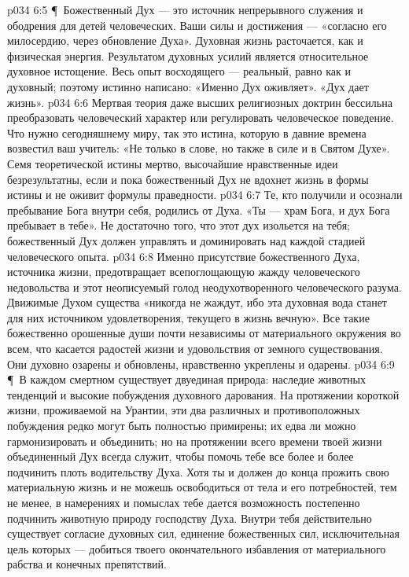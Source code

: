 \vs p034 6:5 \P\ Божественный Дух --- это источник непрерывного служения и ободрения для детей человеческих. Ваши силы и достижения --- «согласно его милосердию, через обновление Духа». Духовная жизнь расточается, как и физическая энергия. Результатом духовных усилий является относительное духовное истощение. Весь опыт восходящего --- реальный, равно как и духовный; поэтому истинно написано: «Именно Дух оживляет». «Дух дает жизнь».
\vs p034 6:6 Мертвая теория даже высших религиозных доктрин бессильна преобразовать человеческий характер или регулировать человеческое поведение. Что нужно сегодняшнему миру, так это истина, которую в давние времена возвестил ваш учитель: «Не только в слове, но также в силе и в Святом Духе». Семя теоретической истины мертво, высочайшие нравственные идеи безрезультатны, если и пока божественный Дух не вдохнет жизнь в формы истины и не оживит формулы праведности.
\vs p034 6:7 Те, кто получили и осознали пребывание Бога внутри себя, родились от Духа. «Ты --- храм Бога, и дух Бога пребывает в тебе». Не достаточно того, что этот дух изольется на тебя; божественный Дух должен управлять и доминировать над каждой стадией человеческого опыта.
\vs p034 6:8 Именно присутствие божественного Духа, источника жизни, предотвращает всепоглощающую жажду человеческого недовольства и этот неописуемый голод неодухотворенного человеческого разума. Движимые Духом существа «никогда не жаждут, ибо эта духовная вода станет для них источником удовлетворения, текущего в жизнь вечную». Все такие божественно орошенные души почти независимы от материального окружения во всем, что касается радостей жизни и удовольствия от земного существования. Они духовно озарены и обновлены, нравственно укреплены и одарены.
\vs p034 6:9 \P\ В каждом смертном существует двуединая природа: наследие животных тенденций и высокие побуждения духовного дарования. На протяжении короткой жизни, проживаемой на Урантии, эти два различных и противоположных побуждения редко могут быть полностью примирены; их едва ли можно гармонизировать и объединить; но на протяжении всего времени твоей жизни объединенный Дух всегда служит, чтобы помочь тебе все более и более подчинить плоть водительству Духа. Хотя ты и должен до конца прожить свою материальную жизнь и не можешь освободиться от тела и его потребностей, тем не менее, в намерениях и помыслах тебе дается возможность постепенно подчинить животную природу господству Духа. Внутри тебя действительно существует согласие духовных сил, единение божественных сил, исключительная цель которых --- добиться твоего окончательного избавления от материального рабства и конечных препятствий.
